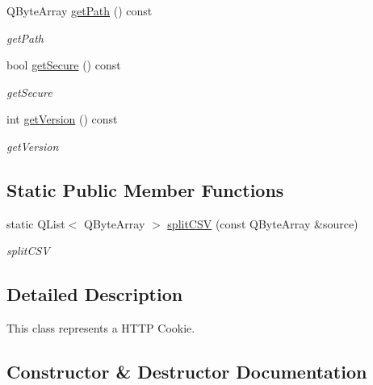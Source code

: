 \begin{DoxyCompactItemize}
Q\+Byte\+Array \hyperlink{class_http_cookie_a3796862a6c50124eb5c987dd617a097c}{get\+Path} () const
\begin{DoxyCompactList}\small\item\em get\+Path \end{DoxyCompactList}\item 
\mbox{\label{class_http_cookie_a270cd78805263b5ed80f4e3354caf4e4}} 
bool \hyperlink{class_http_cookie_a270cd78805263b5ed80f4e3354caf4e4}{get\+Secure} () const
\begin{DoxyCompactList}\small\item\em get\+Secure \end{DoxyCompactList}\item 
\mbox{\label{class_http_cookie_ac390582430915aa5570c6a397f20210d}} 
int \hyperlink{class_http_cookie_ac390582430915aa5570c6a397f20210d}{get\+Version} () const
\begin{DoxyCompactList}\small\item\em get\+Version \end{DoxyCompactList}\end{DoxyCompactItemize}
\subsection*{Static Public Member Functions}
\begin{DoxyCompactItemize}
\item 
static Q\+List$<$ Q\+Byte\+Array $>$ \hyperlink{class_http_cookie_a3f086e32413e23fdab53ffefa70b8b0e}{split\+C\+SV} (const Q\+Byte\+Array \&source)
\begin{DoxyCompactList}\small\item\em split\+C\+SV \end{DoxyCompactList}\end{DoxyCompactItemize}


\subsection{Detailed Description}
This class represents a H\+T\+TP Cookie. 

\subsection{Constructor \& Destructor Documentation}
\mbox{\label{class_http_cookie_aeb0f2cb5f7e8ef2fc7503663e29941c4}} 
